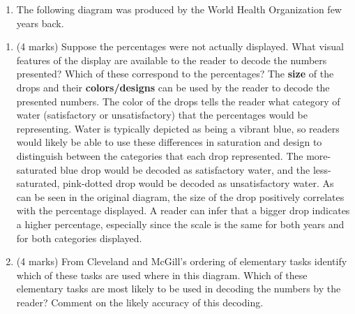 \documentclass[9pt,letter]{article}
\providecommand{\tightlist}{%
  \setlength{\itemsep}{0pt}\setlength{\parskip}{0pt}}
\begin{document}
\begin{enumerate}
  \begin{enumerate}
  \def\labelenumii{(\alph{enumii})}
  \tightlist
  \item
    The following diagram was produced by the World Health Organization
    few years back.
  \end{enumerate}

  \begin{enumerate}
  \def\labelenumii{\roman{enumii}.}
  \tightlist
  \item
    (4 marks) Suppose the percentages were not actually displayed. What
    visual features of the display are available to the reader to decode
    the numbers presented? Which of these correspond to the percentages?
    \newline
     \newline
     The \textbf{size} of the drops and their \textbf{colors/designs}
    can be used by the reader to decode the presented numbers. \newline
     The color of the drops tells the reader what category of water
    (satisfactory or unsatisfactory) that the percentages would be
    representing. Water is typically depicted as being a vibrant blue,
    so readers would likely be able to use these differences in
    saturation and design to distinguish between the categories that
    each drop represented. The more-saturated blue drop would be decoded
    as satisfactory water, and the less-saturated, pink-dotted drop
    would be decoded as unsatisfactory water. \newline
     As can be seen in the original diagram, the size of the drop
    positively correlates with the percentage displayed. A reader can
    infer that a bigger drop indicates a higher percentage, especially
    since the scale is the same for both years and for both categories
    displayed. \vspace{5mm}
  \item
    (4 marks) From Cleveland and McGill's ordering of elementary tasks
    identify which of these tasks are used where in this diagram. Which
    of these elementary tasks are most likely to be used in decoding the
    numbers by the reader? Comment on the likely accuracy of this
    decoding. \vspace{5mm}


\end{enumerate}
\end{enumerate}
\end{document}

